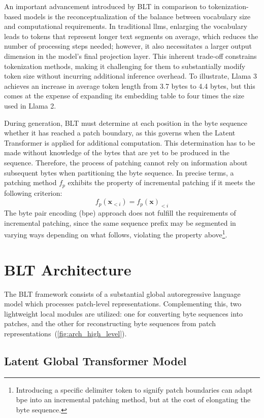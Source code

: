 An important advancement introduced by {\textsc BLT} in comparison to tokenization-based models is the reconceptualization of the balance between vocabulary size and computational requirements. In traditional llms, enlarging the vocabulary leads to tokens that represent longer text segments on average, which reduces the number of processing steps needed; however, it also necessitates a larger output dimension in the model’s final projection layer. This inherent trade-off constrains tokenization methods, making it challenging for them to substantially modify token size without incurring additional inference overhead. To illustrate, Llama 3 achieves an increase in average token length from 3.7 bytes to 4.4 bytes, but this comes at the expense of expanding its embedding table to four times the size used in Llama 2.

During generation, {\textsc BLT} must determine at each position in the byte sequence whether it has reached a patch boundary, as this governs when the Latent Transformer is applied for additional computation. This determination has to be made without knowledge of the bytes that are yet to be produced in the sequence. Therefore, the process of patching cannot rely on information about subsequent bytes when partitioning the byte sequence. In precise terms, a patching method $f_p$ exhibits the property of incremental patching if it meets the following criterion:
$$f_p(\pmb{x}_{<i}) = f_p(\pmb{x})_{<i}$$
The byte pair encoding (bpe) approach does not fulfill the requirements of incremental patching, since the same sequence prefix may be segmented in varying ways depending on what follows, violating the property above\footnote{Introducing a specific delimiter token to signify patch boundaries can adapt bpe into an incremental patching method, but at the cost of elongating the byte sequence.}.

\section{{\textsc BLT} Architecture}
\label{section:architecture}
The {\textsc BLT} framework consists of a substantial global autoregressive language model which processes patch-level representations. Complementing this, two lightweight local modules are utilized: one for converting byte sequences into patches, and the other for reconstructing byte sequences from patch representations~(\autoref{fig:arch_high_level}).

\subsection{Latent Global Transformer Model}

